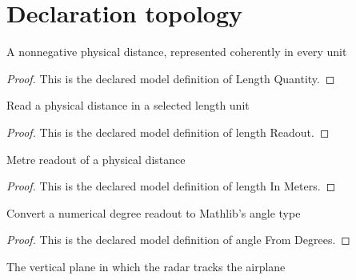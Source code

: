 \section{Declaration topology}
\begin{definition}
  \label{def:physics:phyx-mini-0750:phyxminiproblems-problemphyxmini0750-lengthquantity}
  A nonnegative physical distance, represented coherently in every unit
\end{definition}
\begin{proof}
  This is the declared model definition of Length Quantity.
\end{proof}
\begin{definition}
  \label{def:physics:phyx-mini-0750:phyxminiproblems-problemphyxmini0750-lengthreadout}
  Read a physical distance in a selected length unit
\end{definition}
\begin{proof}
  This is the declared model definition of length Readout.
\end{proof}
\begin{definition}
  \label{def:physics:phyx-mini-0750:phyxminiproblems-problemphyxmini0750-lengthinmeters}
  Metre readout of a physical distance
\end{definition}
\begin{proof}
  This is the declared model definition of length In Meters.
\end{proof}
\begin{definition}
  \label{def:physics:phyx-mini-0750:phyxminiproblems-problemphyxmini0750-anglefromdegrees}
  Convert a numerical degree readout to Mathlib's angle type
\end{definition}
\begin{proof}
  This is the declared model definition of angle From Degrees.
\end{proof}
\begin{definition}
  \label{def:physics:phyx-mini-0750:phyxminiproblems-problemphyxmini0750-trackingplanekind}
  The vertical plane in which the radar tracks the airplane
\end{definition}
